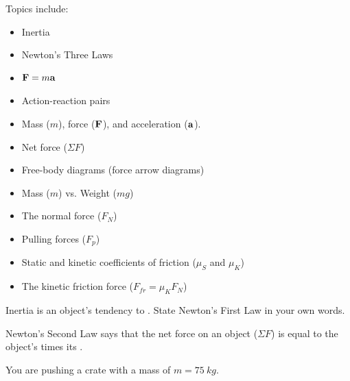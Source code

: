 \begin{questions}
\newpage
{}
Topics include:
\begin{itemize}
\item Inertia
\item Newton's Three Laws
\item $\vb{F}=m\vb{a}$
\item Action-reaction pairs
\item Mass ($m$), force ($\vb{F}$), and acceleration ($\vb{a}$). 
\item Net force ($\Sigma F$)
\item Free-body diagrams (force arrow diagrams)
\item Mass ($m$) vs. Weight ($mg$)
\item The normal force ($F_N$)
\item Pulling forces ($F_p$)
\item Static and kinetic coefficients of friction ($\mu_S$ and $\mu_K$)
\item The kinetic friction force ($F_{fr} = \mu_K F_N$)
\end{itemize}
\question Inertia is an object's tendency to . \qsp
\question State Newton's First Law in your own words. \qsp
\begin{spacing}{1.5}
\question Newton's Second Law says that the net force on an object ($\Sigma F$) is equal to the object's \fillin[mass][5cm] times its \fillin[acceleration][5cm]. \qsp
\end{spacing}
\question You are pushing a crate with a mass of $m=\SI{75}{kg}$. 
\begin{parts}

\end{parts}
\end{questions}
